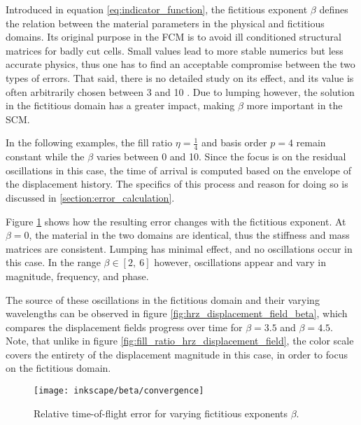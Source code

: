 Introduced in equation \ref{eq:indicator_function}, the fictitious exponent $\beta$ defines the relation between the material parameters in the physical and fictitious domains. Its original purpose in the FCM is to avoid ill conditioned structural matrices for badly cut cells. Small values lead to more stable numerics but less accurate physics, thus one has to find an acceptable compromise between the two types of errors. That said, there is no detailed study on its effect, and its value is often arbitrarily chosen between 3 and 10 \cite{Parvizian2007}. Due to lumping however, the solution in the fictitious domain has a greater impact, making $\beta$ more important in the SCM.

In the following examples, the fill ratio $\eta = \frac{1}{4}$ and basis order $p=4$ remain constant while the $\beta$ varies between 0 and 10. Since the focus is on the residual oscillations in this case, the time of arrival is computed based on the envelope of the displacement history. The specifics of this process and reason for doing so is discussed in \ref{section:error_calculation}.

Figure \ref{fig:beta_convergence} shows how the resulting error changes with the fictitious exponent. At $\beta = 0$, the material in the two domains are identical, thus the stiffness and mass matrices are consistent. Lumping has minimal effect, and no oscillations occur in this case. In the range $\beta \in [2,\ 6]$ however, oscillations appear and vary in magnitude, frequency, and phase.

The source of these oscillations in the fictitious domain and their varying wavelengths can be observed in figure \ref{fig:hrz_displacement_field_beta}, which compares the displacement fields progress over time for $\beta=3.5$ and $\beta=4.5$. Note, that unlike in figure \ref{fig:fill_ratio_hrz_displacement_field}, the color scale covers the entirety of the displacement magnitude in this case, in order to focus on the fictitious domain.

\begin{figure}[!h]
	\centering
	\texttt{[image: inkscape/beta/convergence]}
	\caption{Relative time-of-flight error for varying fictitious exponents $\beta$.}
	\label{fig:beta_convergence}
\end{figure}

